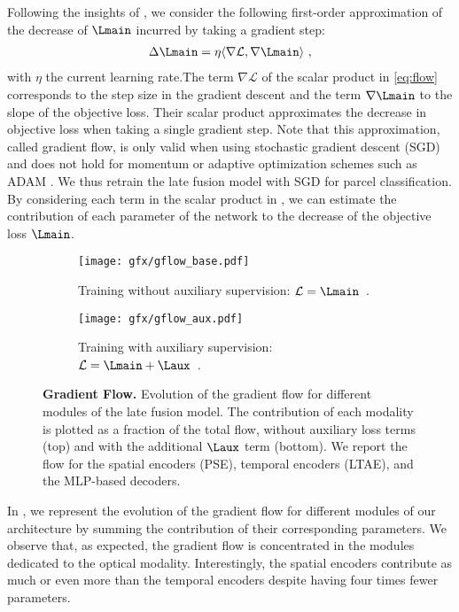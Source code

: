 Following the insights of  \citet{wang2020picking}, we consider the following first-order approximation of the decrease of $\Lmain$ incurred by taking a gradient step:
\begin{align}\label{eq:flow}
    \Delta \Lmain = \eta \langle \nabla \mathcal{L} , \nabla  \Lmain\rangle~,
\end{align}
with $\eta$ the current learning rate.The term $\nabla \mathcal{L}$ of the scalar product in \eqref{eq:flow} corresponds to the step size in the gradient descent and the term $\nabla  \Lmain$ to the slope of the objective loss. Their scalar product approximates the decrease in objective loss when taking a single gradient step. Note that this approximation, called gradient flow, is only valid when using stochastic gradient descent (SGD) and does not hold for momentum or adaptive optimization schemes {such as ADAM \citep{kingma2014adam}}. We thus retrain the late fusion model with SGD for parcel classification. By considering each term in the scalar product in , we can estimate the contribution of each parameter of the network to the decrease of the objective loss $\Lmain$.
\begin{figure}[h]
    \centering
    \begin{subfigure}{\linewidth}
    \centering
    \texttt{[image: gfx/gflow\_base.pdf]}
    \caption{Training without auxiliary supervision: $\mathcal{L} = \Lmain$~.}
    \label{fig:gflow:base}
    \end{subfigure}
    \vfill
    \begin{subfigure}{\linewidth}
    \centering
    \texttt{[image: gfx/gflow\_aux.pdf]}
    \caption{Training with auxiliary supervision: $\mathcal{L} = \Lmain + \Laux$~.}
    \label{fig:gflow:aux}
    \end{subfigure}
    \caption{{\bf Gradient Flow.} Evolution of the gradient flow for different modules of the late fusion model. The contribution of each modality is plotted as a fraction of the total flow, without auxiliary loss terms (top) and with the additional $\Laux$ term (bottom). We report the flow for the spatial encoders (PSE), temporal encoders (LTAE), and the MLP-based decoders.}
    \label{fig:gflow}
\end{figure}

In , we represent the evolution of the gradient flow for different modules of our architecture by summing the contribution of their corresponding parameters.
We observe that, as expected, the gradient flow is concentrated in the modules dedicated to the optical modality. Interestingly, the spatial encoders contribute as much or even more than the temporal encoders despite having four times fewer parameters.

